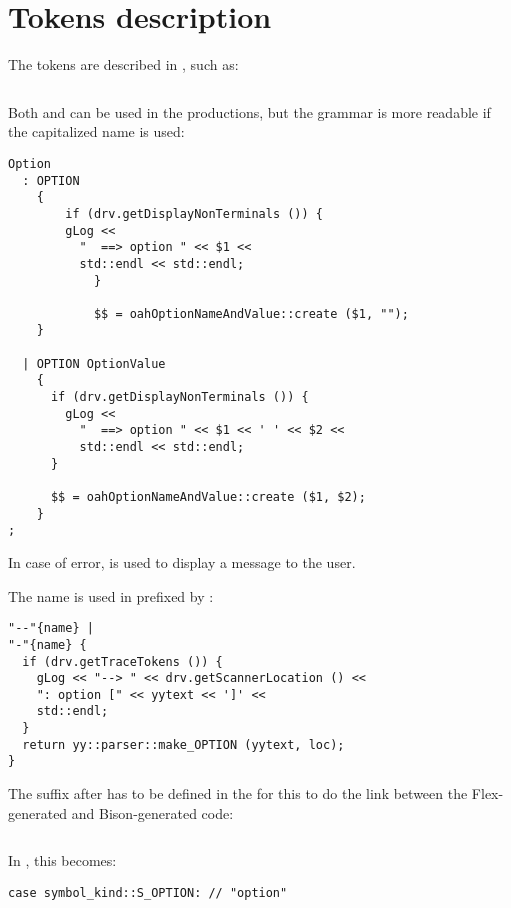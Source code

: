 

\section{Tokens description}\label{Tokens description}

The tokens are described in , such as:
\begin{lstlisting}[language=Bison]
%token <std::string> OPTION "option"
\end{lstlisting}

Both  and  can be used in the productions, but the grammar is more readable if the capitalized name is used:
\begin{lstlisting}[language=Bison]
Option
  : OPTION
    {
	    if (drv.getDisplayNonTerminals ()) {
        gLog <<
          "  ==> option " << $1 <<
          std::endl << std::endl;
			}

			$$ = oahOptionNameAndValue::create ($1, "");
    }

  | OPTION OptionValue
    {
      if (drv.getDisplayNonTerminals ()) {
        gLog <<
          "  ==> option " << $1 << ' ' << $2 <<
          std::endl << std::endl;
      }

      $$ = oahOptionNameAndValue::create ($1, $2);
    }
;
\end{lstlisting}

In case of error,  is used to display a message to the user.

The name  is used in  prefixed by :
\begin{lstlisting}[language=Flex]
"--"{name} |
"-"{name} {
  if (drv.getTraceTokens ()) {
    gLog << "--> " << drv.getScannerLocation () <<
    ": option [" << yytext << ']' <<
    std::endl;
  }
  return yy::parser::make_OPTION (yytext, loc);
}
\end{lstlisting}

The suffix after  has to be defined in the  for this to do the link between the Flex-generated and Bison-generated code:
\begin{lstlisting}[language=Terminal]
%token <std::string> OPTION "option"
\end{lstlisting}

In , this becomes:
\begin{lstlisting}[language=CPlusPlus]
      case symbol_kind::S_OPTION: // "option"
\end{lstlisting}

